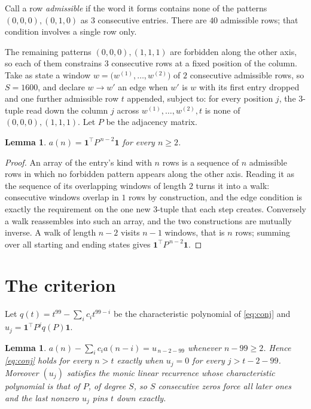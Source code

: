 \documentclass[11pt,a4paper]{article}
\theoremstyle{plain}
\newtheorem{lemma}[theorem]{Lemma}
\theoremstyle{definition}
\begin{document}
Call a row \emph{admissible} if the word it forms contains none of the patterns
$(0,0,0), (0,1,0)$ as $3$ consecutive entries. There are $40$ admissible rows; that condition
involves a single row only.

The remaining patterns $(0,0,0), (1,1,1)$ are forbidden along the other axis, so each of them
constrains $3$ consecutive rows at a fixed position of the column. Take as state a
window $w=\bigl(w^{(1)},\dots,w^{(2)}\bigr)$ of $2$ consecutive admissible
rows, so $S=1600$, and declare $w\to w'$ an edge when $w'$ is $w$ with its first entry
dropped and one further admissible row $t$ appended, subject to: for every position
$j$, the $3$-tuple read down the column $j$ across $w^{(1)},\dots,w^{(2)},t$
is none of $(0,0,0), (1,1,1)$. Let $P$ be the adjacency matrix.

\begin{lemma}\label{lem:walk}
$a(n)=\mathbf{1}^{\!\top}P^{\,n-2}\mathbf{1}$ for every $n\ge2$.
\end{lemma}

\begin{proof}
An array of the entry's kind with $n$ rows is a sequence of $n$ admissible rows in
which no forbidden pattern appears along the other axis. Reading it as the sequence of its
overlapping windows of length $2$ turns it into a walk: consecutive windows overlap in
$1$ rows by construction, and the edge condition is exactly the requirement on the one
new $3$-tuple that each step creates. Conversely a walk reassembles into such an array,
and the two constructions are mutually inverse. A walk of length $n-2$ visits $n-1$
windows, that is $n$ rows; summing over all starting and ending states gives
$\mathbf{1}^{\!\top}P^{\,n-2}\mathbf{1}$.
\end{proof}

\section{The criterion}

Let $q(t)=t^{99}-\sum_i c_i t^{99-i}$ be the characteristic polynomial of
\eqref{eq:conj} and $u_j=\mathbf{1}^{\!\top}P^{j}q(P)\mathbf{1}$.

\begin{lemma}\label{lem:crit}
$a(n)-\sum_i c_i a(n-i)=u_{\,n-2-99}$ whenever $n-99\ge2$. Hence
\eqref{eq:conj} holds for every $n>t$ exactly when $u_j=0$ for every
$j>t-2-99$. Moreover $(u_j)$ satisfies the monic linear recurrence whose
characteristic polynomial is that of $P$, of degree $S$, so $S$ consecutive zeros force all
later ones and the last nonzero $u_j$ pins $t$ down exactly.
\end{lemma}
\end{document}
